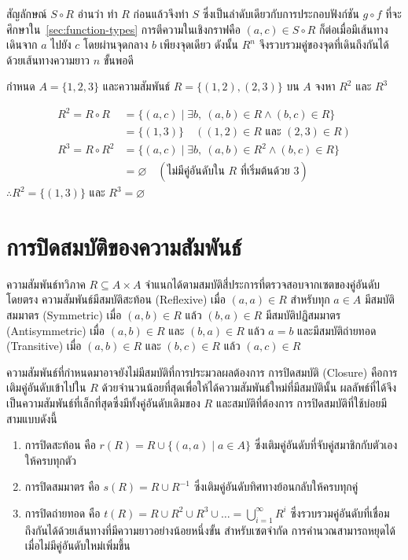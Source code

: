 สัญลักษณ์ $S \circ R$ อ่านว่า ทำ $R$ ก่อนแล้วจึงทำ $S$ ซึ่งเป็นลำดับเดียวกับการประกอบฟังก์ชัน $g \circ f$ ที่จะศึกษาใน~\autoref{sec:function-types} การตีความในเชิงกราฟคือ $(a,c) \in S \circ R$ ก็ต่อเมื่อมีเส้นทางเดินจาก $a$ ไปยัง $c$ โดยผ่านจุดกลาง $b$ เพียงจุดเดียว ดังนั้น $R^n$ จึงรวบรวมคู่ของจุดที่เดินถึงกันได้ด้วยเส้นทางความยาว $n$ ขั้นพอดี

\begin{ex}
\label{ex:relation-composition}
กำหนด $A = \{1,2,3\}$ และความสัมพันธ์ $R = \{(1,2),(2,3)\}$ บน $A$ จงหา $R^2$ และ $R^3$
\end{ex}
\begin{solution}
\begin{align*}
R^2 = R \circ R &= \{(a,c) \mid \exists b,\ (a,b) \in R \land (b,c) \in R\}\\
&= \{(1,3)\} \quad ((1,2) \in R \text{ และ } (2,3) \in R)\\
R^3 = R \circ R^2 &= \{(a,c) \mid \exists b,\ (a,b) \in R^2 \land (b,c) \in R\}\\
&= \varnothing \quad (\text{ไม่มีคู่อันดับใน } R \text{ ที่เริ่มต้นด้วย } 3)
\end{align*}
$\therefore R^2 = \{(1,3)\}$ และ $R^3 = \varnothing$ \solhere
\end{solution}

\section{การปิดสมบัติของความสัมพันธ์}
\label{sec:relation-closure}
ความสัมพันธ์ทวิภาค $R \subseteq A \times A$ จำแนกได้ตามสมบัติสี่ประการที่ตรวจสอบจากเซตของคู่อันดับโดยตรง ความสัมพันธ์มีสมบัติสะท้อน (Reflexive) เมื่อ $(a,a) \in R$ สำหรับทุก $a \in A$ มีสมบัติสมมาตร (Symmetric) เมื่อ $(a,b) \in R$ แล้ว $(b,a) \in R$ มีสมบัติปฏิสมมาตร (Antisymmetric) เมื่อ $(a,b) \in R$ และ $(b,a) \in R$ แล้ว $a = b$ และมีสมบัติถ่ายทอด (Transitive) เมื่อ $(a,b) \in R$ และ $(b,c) \in R$ แล้ว $(a,c) \in R$~\parencite{kolman2008discrete}

ความสัมพันธ์ที่กำหนดมาอาจยังไม่มีสมบัติที่การประมวลผลต้องการ การปิดสมบัติ (Closure) คือการเติมคู่อันดับเข้าไปใน $R$ ด้วยจำนวนน้อยที่สุดเพื่อให้ได้ความสัมพันธ์ใหม่ที่มีสมบัตินั้น ผลลัพธ์ที่ได้จึงเป็นความสัมพันธ์ที่เล็กที่สุดซึ่งมีทั้งคู่อันดับเดิมของ $R$ และสมบัติที่ต้องการ การปิดสมบัติที่ใช้บ่อยมีสามแบบดังนี้
\begin{enumerate}[label=\textbf{\arabic*.}]
    \item การปิดสะท้อน คือ $r(R) = R \cup \{(a,a) \mid a \in A\}$ ซึ่งเติมคู่อันดับที่จับคู่สมาชิกกับตัวเองให้ครบทุกตัว
    \item การปิดสมมาตร คือ $s(R) = R \cup R^{-1}$ ซึ่งเติมคู่อันดับทิศทางย้อนกลับให้ครบทุกคู่
    \item การปิดถ่ายทอด คือ $t(R) = R \cup R^2 \cup R^3 \cup \dots = \bigcup_{i=1}^{\infty} R^i$ ซึ่งรวบรวมคู่อันดับที่เชื่อมถึงกันได้ด้วยเส้นทางที่มีความยาวอย่างน้อยหนึ่งขั้น สำหรับเซตจำกัด การคำนวณสามารถหยุดได้เมื่อไม่มีคู่อันดับใหม่เพิ่มขึ้น
\end{enumerate}

